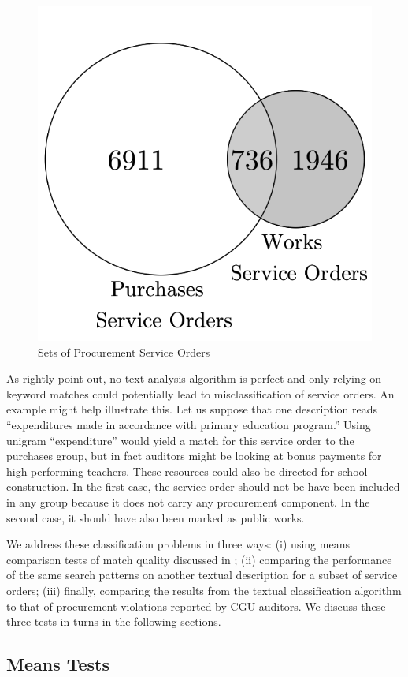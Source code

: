 \documentclass[11pt]{article}
\begin{document}
\begin{figure}[!htbp]
\caption{\label{fig:venn} Sets of Procurement Service Orders}
\centering
\includegraphics[width=0.3\linewidth]{venn}
\end{figure}

As \citet{GrimmerTextDataPromise2013a} rightly point out, no text analysis algorithm is perfect and only relying on keyword matches could potentially lead to misclassification of service orders. An example might help illustrate this. Let us suppose that one description reads ``expenditures made in accordance with primary education program.'' Using unigram ``expenditure'' would yield a match for this service order to the purchases group, but in fact auditors might be looking at bonus payments for high-performing teachers. These resources could also be directed for school construction. In the first case, the service order should not be have been included in any group because it does not carry any procurement component. In the second case, it should have also been marked as public works.

We address these classification problems in three ways: (i) using means comparison tests of match quality discussed in \citet{AssumpcaotextfindDataDrivenText2018}; (ii) comparing the performance of the same search patterns on another textual description for a subset of service orders; (iii) finally, comparing the results from the textual classification algorithm to that of procurement violations reported by CGU auditors. We discuss these three tests in turns in the following sections.

\subsection{Means Tests}\label{subsec:quality1}
\end{document}
